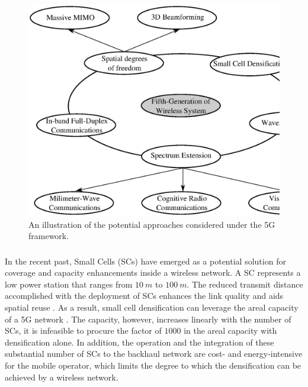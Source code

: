 \begin{figure}
\centering
\includegraphics[width = 0.98 \columnwidth]{figures/5G}
\caption{An illustration of the potential approaches considered under the 5G framework.}
\label{fig_Int:5G}
\end{figure}


\subsubsection*{}

In the recent past, Small Cells (SCs) have emerged as a potential solution for coverage and capacity enhancements inside a wireless network. A SC represents a low power station that ranges from $\SI{10}{m}$ to $\SI{100}{m}$. The reduced transmit distance accomplished with the deployment of SCs enhances the link quality and aids spatial reuse \cite{Chander08}.
As a result, small cell densification can leverage the areal capacity of a 5G network \cite{Andrews14}. The capacity, however, increases linearly with the number of SCs, it is infeasible to procure the factor of $1000$ in the areal capacity with densification alone. In addition, the operation and the integration of these substantial number of SCs to the backhaul network are cost- and energy-intensive for the mobile operator, which limits the degree to which the densification can be achieved by a wireless network.





